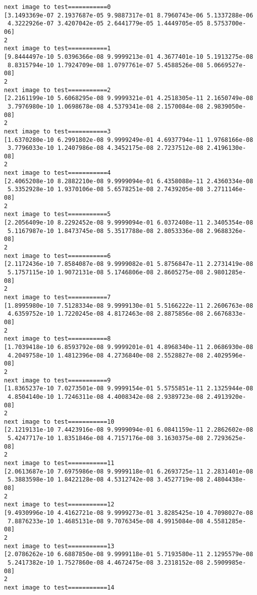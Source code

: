 \documentclass[11pt]{article}
\begin{document}
    \begin{Verbatim}[commandchars=\\\{\}]
next image to test===========0
[3.1493369e-07 2.1937687e-05 9.9887317e-01 8.7960743e-06 5.1337288e-06
 4.3222926e-07 3.4207042e-05 2.6441779e-05 1.4449705e-05 8.5753700e-06]
2
next image to test===========1
[9.8444497e-10 5.0396366e-08 9.9999213e-01 4.3677401e-10 5.1913275e-08
 8.8315794e-10 1.7924709e-08 1.0797761e-07 5.4588526e-08 5.0669527e-08]
2
next image to test===========2
[2.2161199e-10 5.6068295e-08 9.9999321e-01 4.2518305e-11 2.1650749e-08
 3.7976980e-10 1.0698678e-08 4.5379341e-08 2.1570084e-08 2.9839050e-08]
2
next image to test===========3
[1.6370280e-10 6.2991802e-08 9.9999249e-01 4.6937794e-11 1.9768166e-08
 3.7796033e-10 1.2407986e-08 4.3452175e-08 2.7237512e-08 2.4196130e-08]
2
next image to test===========4
[2.4065208e-10 8.2882210e-08 9.9999094e-01 6.4358088e-11 2.4360334e-08
 5.3352928e-10 1.9370106e-08 5.6578251e-08 2.7439205e-08 3.2711146e-08]
2
next image to test===========5
[2.2056409e-10 8.2292452e-08 9.9999094e-01 6.0372408e-11 2.3405354e-08
 5.1167987e-10 1.8473745e-08 5.3517788e-08 2.8053336e-08 2.9688326e-08]
2
next image to test===========6
[2.1172436e-10 7.8584087e-08 9.9999082e-01 5.8756847e-11 2.2731419e-08
 5.1757115e-10 1.9072131e-08 5.1746806e-08 2.8605275e-08 2.9801285e-08]
2
next image to test===========7
[1.8995980e-10 7.5128334e-08 9.9999130e-01 5.5166222e-11 2.2606763e-08
 4.6359752e-10 1.7220245e-08 4.8172463e-08 2.8875856e-08 2.6676833e-08]
2
next image to test===========8
[1.7039418e-10 6.8593792e-08 9.9999201e-01 4.8968340e-11 2.0686930e-08
 4.2049758e-10 1.4812396e-08 4.2736840e-08 2.5528827e-08 2.4029596e-08]
2
next image to test===========9
[1.8365237e-10 7.0273501e-08 9.9999154e-01 5.5755851e-11 2.1325944e-08
 4.8504140e-10 1.7246311e-08 4.4008342e-08 2.9389723e-08 2.4913920e-08]
2
next image to test===========10
[2.1219131e-10 7.4423916e-08 9.9999094e-01 6.0841159e-11 2.2862602e-08
 5.4247717e-10 1.8351846e-08 4.7157176e-08 3.1630375e-08 2.7293625e-08]
2
next image to test===========11
[2.0613687e-10 7.6975986e-08 9.9999118e-01 6.2693725e-11 2.2831401e-08
 5.3883598e-10 1.8422128e-08 4.5312742e-08 3.4527719e-08 2.4804438e-08]
2
next image to test===========12
[9.4930996e-10 4.4162721e-08 9.9999273e-01 3.8285425e-10 4.7098027e-08
 7.8876233e-10 1.4685131e-08 9.7076345e-08 4.9915084e-08 4.5581285e-08]
2
next image to test===========13
[2.0786262e-10 6.6887850e-08 9.9999118e-01 5.7193580e-11 2.1295579e-08
 5.2417382e-10 1.7527860e-08 4.4672475e-08 3.2318152e-08 2.5909985e-08]
2
next image to test===========14

\end{Verbatim}
\end{document}
